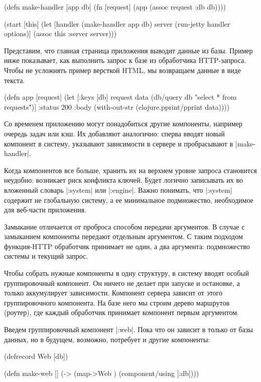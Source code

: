 \begin{code}
(defn make-handler [app db]
  (fn [request]
    (app (assoc request :db db))))

(start [this]
  (let [handler (make-handler app db)
        server (run-jetty handler options)]
    (assoc this :server server)))
\end{code}

Представим, что главная страница приложения выводит данные из базы. Пример ниже
показывает, как выполнить запрос к базе из обработчика HTTP-запроса. Чтобы не
усложнять пример версткой HTML, мы возвращаем данные в виде текста.

\begin{code}
(defn app
  [request]
  (let [{:keys [db]} request
        data (db/query db "select * from requests")]
    {:status 200
     :body (with-out-str
             (clojure.pprint/pprint data))}))
\end{code}

Со временем приложению могут понадобиться другие компоненты, например очередь
задач или кэш. Их добавляют аналогично: сперва вводят новый компонент в систему,
указывают зависимости в сервере и пробрасывают в \spverb|make-handler|.

Когда компонентов все больше, хранить их на верхнем уровне запроса становится
неудобно: возникает риск конфликта ключей. Будет логично записывать их во
вложенный словарь \spverb|:system| или \spverb|:engine|. Важно понимать, что \spverb|:system|
содержит не глобальную систему, а ее минимальное подмножество, необходимое для
веб-части приложения.

Замыкание отличается от проброса способом передачи аргументов. В случае с
замыканием компоненты передают отдельным аргументом. С таким подходом
функция-HTTP обработчик принимает не один, а два аргумента: подмножество системы
и текущий запрос.

Чтобы собрать нужные компоненты в одну структуру, в систему вводят особый
группировочный компонент. Он ничего не делает при запуске и остановке, а только
аккумулирует зависимости. Компонент сервера зависит от этого группировочного
компонента. На базе него мы строим дерево маршрутов (роутер), где каждый
обработчик принимает компонент первым аргументом.

Введем группировочный компонент \spverb|:web|. Пока что он зависит в только от базы
данных, но в будущем, возможно, потребует и другие компоненты:

\begin{code}
(defrecord Web [db])

(defn make-web []
  (-> (map->Web {})
      (component/using [:db])))
\end{code}

